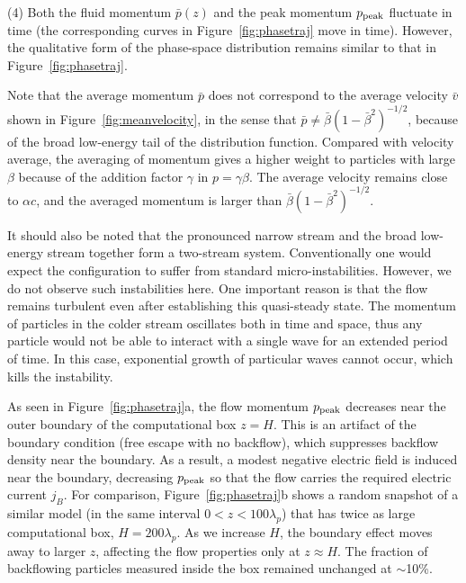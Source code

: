 (4) Both the fluid momentum $\bar{p}(z)$ and the peak momentum $p_{\rm peak}$
fluctuate in time (the corresponding curves in Figure~\ref{fig:phasetraj} move in time).
However, the qualitative form of the
phase-space distribution remains similar to that in Figure~\ref{fig:phasetraj}.

Note that the average momentum $\bar{p}$ does not correspond to
the average velocity $\bar{v}$ shown in Figure~\ref{fig:meanvelocity}, in the sense that
$\bar{p} \neq \bar{\beta}(1-\bar{\beta}^2)^{-1/2}$, because of the broad low-energy tail of
the distribution function. Compared with velocity average,
 the averaging of momentum gives a higher weight to particles with
 large $\beta$ because of the addition factor $\gamma$ in $p=\gamma\beta$.
The average velocity remains close to $\alpha c$, and the averaged momentum is
larger than $\bar{\beta}(1-\bar{\beta}^2)^{-1/2}$.

It should also be noted that the pronounced narrow stream and the broad low-energy stream together
form a two-stream system. Conventionally one would expect the configuration to suffer
from standard micro-instabilities. However, we do not observe such instabilities here.
One important reason is that the
flow remains turbulent even after establishing this quasi-steady state. The momentum
of particles in the colder stream oscillates both in time and space, thus any particle
would not be able to interact with a single wave for an extended period of time. In this
case, exponential growth of particular waves cannot occur, which kills the instability.

As seen in Figure~\ref{fig:phasetraj}a, the flow momentum $p_{\rm peak}$ decreases
near the outer boundary of the computational box $z=H$.
This is an artifact of the boundary condition (free escape with no backflow), which
suppresses backflow density near the boundary. As a result, a modest negative electric
field is induced near the boundary, decreasing $p_{\rm peak}$ so that the flow carries
the required electric current $j_B$.
For comparison, Figure~\ref{fig:phasetraj}b shows a random snapshot of a similar model (in the same interval $0<z<100\lambda_p$) that has twice as large computational box, $H=200\lambda_p$.
As we increase $H$, the boundary effect moves away to larger $z$, affecting the flow
properties only at $z\approx H$. The fraction of backflowing particles measured inside the
box remained unchanged at $\sim$10\%.

